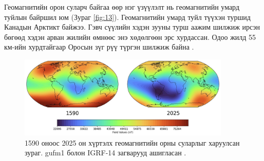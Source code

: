 \documentclass[10pt,twocolumn,letterpaper]{article}
\begin{document}
Геомагнитийн орон суларч байгаа өөр нэг үзүүлэлт нь геомагнитийн умард туйлын байршил юм (Зураг \ref{fig:13}). Геомагнитийн умард туйл түүхэн туршид Канадын Арктикт байжээ. Гэвч сүүлийн хэдэн зууны турш аажим шилжиж ирсэн бөгөөд хэдэн арван жилийн өмнөөс энэ хөдөлгөөн эрс хурдассан. Одоо жилд 55 км-ийн хурдтайгаар Оросын зүг рүү түргэн шилжиж байна \cite{124}.

\begin{figure}[t]
\begin{center}
\includegraphics[width=0.9\textwidth]{saa.jpg}
\end{center}
   \caption{1590 оноос 2025 он хүртэлх геомагнитийн орны суларлыг харуулсан зураг. gufm1 болон IGRF-14 загварууд ашигласан \cite{125,126}.}
\label{fig:14}
\end{figure}
\end{document}
